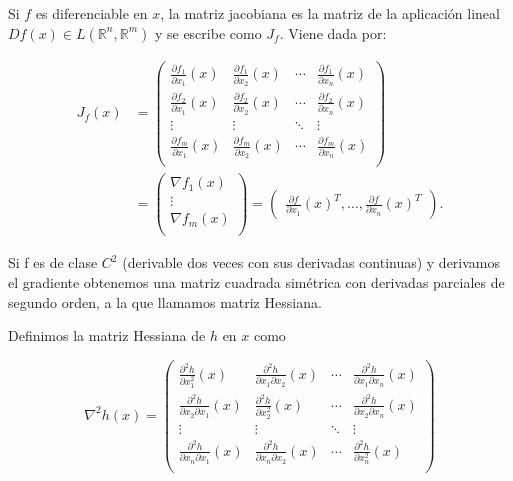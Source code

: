 \begin{definicion}
    Si $f$ es diferenciable en $ x$, la matriz jacobiana es la matriz de la aplicación lineal $Df(x) \in L \left (\mathbb{R}^n, \mathbb{R}^m \right )$ y se escribe como $J_f$. Viene dada por:

 \begin{align*}
	J_f(x)&= \begin{pmatrix}
	 \frac{\partial f_1}{\partial x_1}(x) & \frac{\partial f_1}{\partial x_2}(x) & \cdots & \frac{\partial f_1}{\partial x_n}(x) \\
	 \frac{\partial f_2}{\partial x_1}(x) & \frac{\partial f_2}{\partial x_2}(x) & \cdots & \frac{\partial f_2}{\partial x_n}(x) \\
	 \vdots & \vdots & \ddots & \vdots \\
	 \frac{\partial f_m}{\partial x_1}(x) & \frac{\partial f_m}{\partial x_2}(x) & \cdots & \frac{\partial f_m}{\partial x_n}(x) \\
	\end{pmatrix} \\	
	&= \begin{pmatrix}
	 \nabla f_1(x)\\
	 \vdots \\
	 \nabla f_m(x) \\
	\end{pmatrix}=
	\begin{pmatrix}
	     \frac{\partial f}{\partial x_1}(x)^T, \ldots, \frac{\partial f}{\partial x_n}(x)^T
	\end{pmatrix}.
\end{align*}

\end{definicion}



Si f es de clase $C^2$ (derivable dos veces con sus derivadas continuas) y derivamos el gradiente obtenemos una matriz cuadrada simétrica con derivadas parciales de segundo orden, a la que llamamos matriz Hessiana.

\begin{definicion}
	Definimos la matriz Hessiana de $h$ en $x$ como

	$$\nabla^2h(x)= \begin{pmatrix}
		\frac{\partial^2h}{\partial x^{2}_1}(x) & \frac{\partial^2h}{\partial x_1\partial x_2}(x) & \cdots & \frac{\partial^2h}{\partial x_1 \partial x_n}(x)\\
		\frac{\partial^2h}{\partial x_2 \partial x_1}(x) & \frac{\partial^2h}{\partial x^{2}_2}(x) & \cdots & \frac{\partial^2h}{\partial x_2 \partial x_n}(x)\\
		\vdots & \vdots & \ddots & \vdots \\
		\frac{\partial^2h}{\partial x_n \partial x_1}(x) & \frac{\partial^2h}{\partial x_n \partial x_2}(x) & \cdots & \frac{\partial^2h}{\partial x^{2}_n}(x)\\
	\end{pmatrix}$$

\end{definicion}

